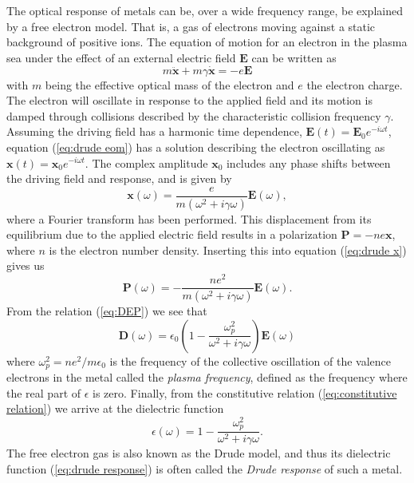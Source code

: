 The optical response of metals can be, over a wide frequency range, be explained by a free electron model. That is, a gas of electrons moving against a static background of positive ions. The equation of motion for an electron in the plasma sea under the effect of an external electric field $\mathbf{E}$ can be written as 
\begin{equation}
    m\mathbf{\ddot{x}} + m\gamma\mathbf{\dot{x}} = -e\mathbf{E}
    \label{eq:drude eom}
\end{equation}
with $m$ being the effective optical mass of the electron and $e$ the electron charge. The electron will oscillate in response to the applied field and its motion is damped through collisions described by the characteristic collision frequency $\gamma$. Assuming the driving field has a harmonic time dependence, $\mathbf{E}(t) = \mathbf{E}_0e^{-i\omega t}$, equation (\ref{eq:drude eom}) has a solution describing the electron oscillating as $\mathbf{x}(t)=\mathbf{x}_0e^{-i\omega t}$. The complex amplitude $\mathbf{x}_0$ includes any phase shifts between the driving field and response, and is given by \cite{maier}
\begin{equation}
    \mathbf{x}(\omega) = \frac{e}{m(\omega^2 + i\gamma\omega)} \mathbf{E}(\omega),
    \label{eq:drude x}
\end{equation}
where a Fourier transform has been performed. This displacement from its equilibrium due to the applied electric field results in a polarization $\mathbf{P} = -ne\mathbf{x}$, where $n$ is the electron number density. Inserting this into equation (\ref{eq:drude x}) gives us
\begin{equation}
    \mathbf{P}(\omega) = -\frac{ne^2}{m(\omega^2 + i\gamma\omega)} \mathbf{E}(\omega).
    \label{eq:polarization}
\end{equation}
From the relation (\ref{eq:DEP}) we see that
\begin{equation}
    \mathbf{D}(\omega) = \epsilon_0(1 - \frac{\omega_p^2}{\omega^2 + i\gamma \omega}) \mathbf{E}(\omega)
\end{equation}
where $\omega_p^2 = ne^2/m\epsilon_0$ is the frequency of the collective oscillation of the valence electrons in the metal called the \emph{plasma frequency}, defined as the frequency where the real part of $\epsilon$ is zero\cite{web:dresselhaus}. Finally, from the constitutive relation (\ref{eq:constitutive relation}) we arrive at the dielectric function
\begin{equation}
    \epsilon(\omega) = 1-\frac{\omega_p^2}{\omega^2 + i\gamma \omega}.
    \label{eq:drude response}
\end{equation}
The free electron gas is also known as the Drude model, and thus its dielectric function (\ref{eq:drude response}) is often called the \emph{Drude response} of such a metal.

